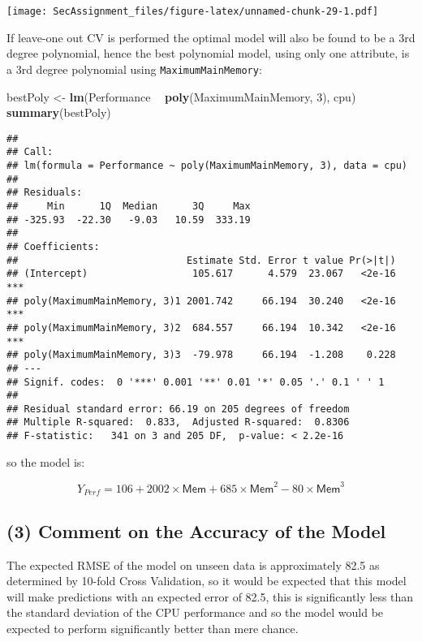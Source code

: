 \documentclass[12pt]{article}
\newenvironment{Shaded}{\begin{snugshade}}{\end{snugshade}}
\newcommand{\DecValTok}[1]{\textcolor[rgb]{0.00,0.00,0.81}{#1}}
\newcommand{\KeywordTok}[1]{\textcolor[rgb]{0.13,0.29,0.53}{\textbf{#1}}}
\newcommand{\NormalTok}[1]{#1}
\newcommand{\OperatorTok}[1]{\textcolor[rgb]{0.81,0.36,0.00}{\textbf{#1}}}
\newcommand{\StringTok}[1]{\textcolor[rgb]{0.31,0.60,0.02}{#1}}
\begin{document}
\texttt{[image: SecAssignment\_files/figure-latex/unnamed-chunk-29-1.pdf]}

If leave-one out CV is performed the optimal model will also be found to
be a 3rd degree polynomial, hence the best polynomial model, using only
one attribute, is a 3rd degree polynomial using
\texttt{MaximumMainMemory}:

\begin{Shaded}
\begin{Highlighting}[]
\NormalTok{bestPoly <-}\StringTok{ }\KeywordTok{lm}\NormalTok{(Performance }\OperatorTok{~}\StringTok{ }\KeywordTok{poly}\NormalTok{(MaximumMainMemory, }\DecValTok{3}\NormalTok{), cpu)}
\KeywordTok{summary}\NormalTok{(bestPoly)}
\end{Highlighting}
\end{Shaded}

\begin{verbatim}
## 
## Call:
## lm(formula = Performance ~ poly(MaximumMainMemory, 3), data = cpu)
## 
## Residuals:
##     Min      1Q  Median      3Q     Max 
## -325.93  -22.30   -9.03   10.59  333.19 
## 
## Coefficients:
##                             Estimate Std. Error t value Pr(>|t|)    
## (Intercept)                  105.617      4.579  23.067   <2e-16 ***
## poly(MaximumMainMemory, 3)1 2001.742     66.194  30.240   <2e-16 ***
## poly(MaximumMainMemory, 3)2  684.557     66.194  10.342   <2e-16 ***
## poly(MaximumMainMemory, 3)3  -79.978     66.194  -1.208    0.228    
## ---
## Signif. codes:  0 '***' 0.001 '**' 0.01 '*' 0.05 '.' 0.1 ' ' 1
## 
## Residual standard error: 66.19 on 205 degrees of freedom
## Multiple R-squared:  0.833,  Adjusted R-squared:  0.8306 
## F-statistic:   341 on 3 and 205 DF,  p-value: < 2.2e-16
\end{verbatim}

so the model is:

\[
Y_{Perf} = 106 + 2002 \times \textsf{Mem} + 685 \times \textsf{Mem}^2 -80 \times \textsf{Mem}^3
\]

\hypertarget{comment-on-the-accuracy-of-the-model}{%
\subsection{(3) Comment on the Accuracy of the
Model}\label{comment-on-the-accuracy-of-the-model}}

The expected RMSE of the model on unseen data is approximately 82.5 as
determined by 10-fold Cross Validation, so it would be expected that
this model will make predictions with an expected error of 82.5, this is
significantly less than the standard deviation of the CPU performance
and so the model would be expected to perform significantly better than
mere chance.
\end{document}
